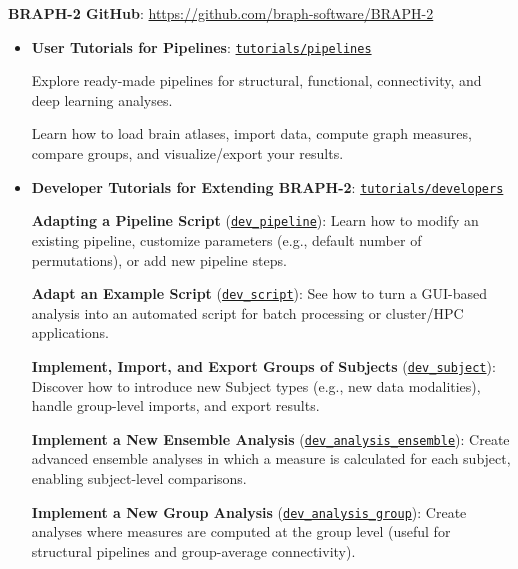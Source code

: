 \documentclass[justified]{tufte-handout}
\begin{document}
\textbf{BRAPH-2 GitHub}: \url{https://github.com/braph-software/BRAPH-2}

\begin{itemize}

\item \textbf{User Tutorials for Pipelines}: \href{https://github.com/braph-software/BRAPH-2/tree/develop/tutorials/pipelines}{\texttt{tutorials/pipelines}}

Explore ready-made pipelines for structural, functional, connectivity, and deep learning analyses.

Learn how to load brain atlases, import data, compute graph measures, compare groups, and visualize/export your results.


\item \textbf{Developer Tutorials for Extending BRAPH-2}: \href{https://github.com/braph-software/BRAPH-2/tree/develop/tutorials/developers}{\texttt{tutorials/developers}}

\textbf{Adapting a Pipeline Script} (\href{https://github.com/braph-software/BRAPH-2/tree/develop/tutorials/developers/dev_pipeline}{\texttt{dev\_pipeline}}):  
Learn how to modify an existing pipeline, customize parameters (e.g., default number of permutations), or add new pipeline steps.

\textbf{Adapt an Example Script} (\href{https://github.com/braph-software/BRAPH-2/tree/develop/tutorials/developers/dev_script}{\texttt{dev\_script}}):  
See how to turn a GUI-based analysis into an automated script for batch processing or cluster/HPC applications.

\textbf{Implement, Import, and Export Groups of Subjects} (\href{https://github.com/braph-software/BRAPH-2/tree/develop/tutorials/developers/dev_subject}{\texttt{dev\_subject}}):  
Discover how to introduce new Subject types (e.g., new data modalities), handle group-level imports, and export results.

\textbf{Implement a New Ensemble Analysis} (\href{https://github.com/braph-software/BRAPH-2/tree/develop/tutorials/developers/dev_analysis_ensemble}{\texttt{dev\_analysis\_ensemble}}):  
Create advanced ensemble analyses in which a measure is calculated for each subject, enabling subject-level comparisons.

\textbf{Implement a New Group Analysis} (\href{https://github.com/braph-software/BRAPH-2/tree/develop/tutorials/developers/dev_analysis_group}{\texttt{dev\_analysis\_group}}):  
Create analyses where measures are computed at the group level (useful for structural pipelines and group-average connectivity).


\end{itemize}
\end{document}
